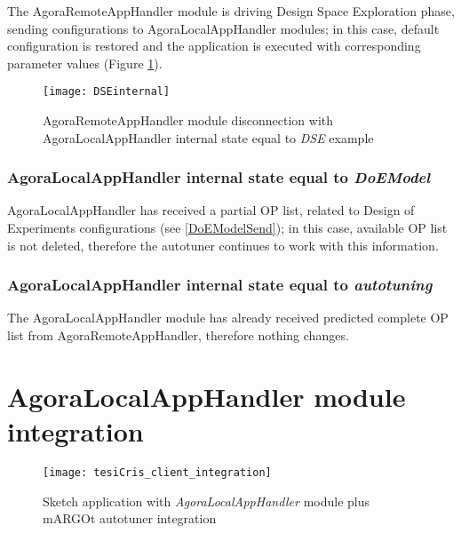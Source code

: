 The AgoraRemoteAppHandler module is driving Design Space Exploration phase, sending configurations to AgoraLocalAppHandler modules; in this case, default configuration is restored and the application is executed with corresponding parameter values (Figure \ref{fig::remDiscDSE}).

\begin{figure}[htb]

    \centering
    \texttt{[image: DSEinternal]}
    \caption{AgoraRemoteAppHandler module disconnection with A\-go\-ra\-Local\-App\-Handler internal state equal to \textit{DSE} example}

    \label{fig::remDiscDSE}
    
\end{figure}


\subsubsection{AgoraLocalAppHandler internal state equal to \textit{DoEModel}}

AgoraLocalAppHandler has received a partial OP list, related to Design of Experiments configurations (see \ref{DoEModelSend}); in this case, available OP list is not deleted, therefore the autotuner continues to work with this information.


\subsubsection{AgoraLocalAppHandler internal state equal to \textit{autotuning}}

The AgoraLocalAppHandler module has already received predicted complete OP list from AgoraRemoteAppHandler, therefore nothing changes.





\section{AgoraLocalAppHandler module integration}

\begin{figure}[htb]

    \centering
    \texttt{[image: tesiCris\_client\_integration]}
    \caption{Sketch application with \textit{AgoraLocalAppHandler} module plus mARGOt autotuner integration}
    \label{fig::sketchApp}
    
\end{figure}


